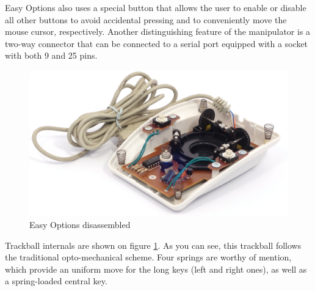 \documentclass[11pt, a4paper]{article}
\begin{document}
Easy Options also uses a special button that allows the user to enable or disable all other buttons to avoid accidental pressing and to conveniently move the mouse cursor, respectively. Another distinguishing feature of the manipulator is a two-way connector that can be connected to a serial port equipped with a socket with both 9 and 25 pins.

\begin{figure}[h]
    \centering
    \includegraphics[scale=0.6]{1993_easy_options_trackball/inside_60.jpg}
    \caption{Easy Options disassembled}
    \label{fig:EasyOptionsInside}
\end{figure}

Trackball internals are shown on figure \ref{fig:EasyOptionsInside}. As you can see, this trackball follows the traditional opto-mechanical scheme. Four springs are worthy of mention, which provide an uniform move for the long keys (left and right ones), as well as a spring-loaded central key.
\end{document}
